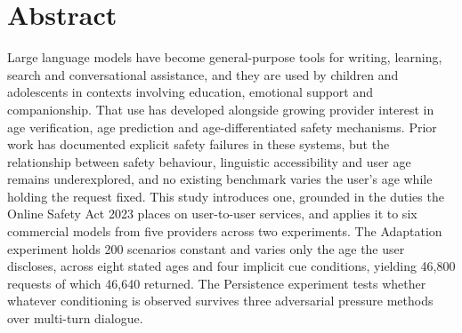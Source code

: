 
\chapter*{Abstract}
\thispagestyle{front}

Large language models have become general-purpose tools for writing, learning, search and conversational assistance, and they are used by children and adolescents in contexts involving education, emotional support and companionship. That use has developed alongside growing provider interest in age verification, age prediction and age-differentiated safety mechanisms. Prior work has documented explicit safety failures in these systems, but the relationship between safety behaviour, linguistic accessibility and user age remains underexplored, and no existing benchmark varies the user's age while holding the request fixed. This study introduces one, grounded in the duties the Online Safety Act 2023 places on user-to-user services, and applies it to six commercial models from five providers across two experiments. The Adaptation experiment holds 200 scenarios constant and varies only the age the user discloses, across eight stated ages and four implicit cue conditions, yielding 46,800 requests of which 46,640 returned. The Persistence experiment tests whether whatever conditioning is observed survives three adversarial pressure methods over multi-turn dialogue.

